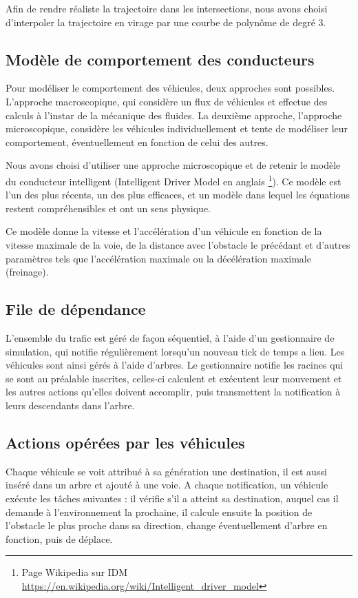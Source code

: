 \documentclass[11pt]{article}
\begin{document}
Afin de rendre réaliste la trajectoire dans les intersections, nous avons choisi d'interpoler la trajectoire en virage par une courbe de polynôme de degré 3. 
\subsection{Modèle de comportement des conducteurs}
Pour modéliser le comportement des véhicules, deux approches sont possibles. L’approche macroscopique, qui considère un flux de véhicules et effectue des calculs à l'instar de la mécanique des fluides. La deuxième approche, l'approche microscopique, considère les véhicules individuellement et tente de modéliser leur comportement, éventuellement en fonction de celui des autres. 

Nous avons choisi d'utiliser une approche microscopique et de retenir le modèle du conducteur intelligent (Intelligent Driver Model en anglais \footnote{Page Wikipedia sur IDM \url{https://en.wikipedia.org/wiki/Intelligent_driver_model}}). Ce modèle est l'un des plus récents, un des plus efficaces, et un modèle dans lequel les équations restent compréhensibles et ont un sens physique.

Ce modèle donne la vitesse et l'accélération d'un véhicule en fonction de la vitesse maximale de la voie, de la distance avec l'obstacle le précédant et d'autres paramètres tels que l'accélération maximale ou la décélération maximale (freinage).

\subsection{File de dépendance}
L'ensemble du trafic est géré de façon séquentiel, à l'aide d'un gestionnaire de simulation, qui notifie régulièrement lorsqu'un nouveau \og tick \fg de temps a lieu. Les véhicules sont ainsi gérés à l'aide d'arbres. Le gestionnaire notifie les racines qui se sont au préalable inscrites, celles-ci calculent et exécutent leur mouvement et les autres actions qu'elles doivent accomplir, puis transmettent la notification à leurs descendants dans l'arbre. 

\subsection{Actions opérées par les véhicules}
Chaque véhicule se voit attribué à sa génération une destination, il est aussi inséré dans un arbre et ajouté à une voie. A chaque notification, un véhicule exécute les tâches suivantes : il vérifie s'il a atteint sa destination, auquel cas il demande à l'environnement la prochaine, il calcule ensuite la position de l'obstacle le plus proche dans sa direction, change éventuellement d'arbre en fonction, puis de déplace. 
\end{document}
